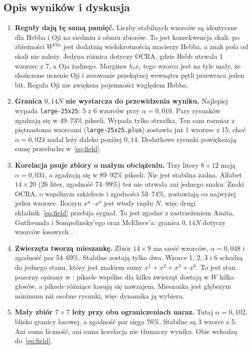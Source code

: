 \documentclass[11pt,a4paper]{article}
\begin{document}
\subsection{Opis wyników i dyskusja}
\begin{enumerate}
    \item \textbf{Reguły dają tę samą pamięć.}
    Liczby stabilnych wzorców są identyczne dla Hebba i Oji na siedmiu z ośmiu zbiorów. To jest konsekwencja skali: po zbieżności \(W^{\mathrm{Oja}}\) jest dodatnią wielokrotnością macierzy Hebba, a znak pola od skali nie zależy. Jedyna różnica dotyczy OCRA, gdzie Hebb utrwala 1 wzorzec z 7, a Oja żadnego. Margines \(h_i x_i\) tego wzorca jest na tyle mały, że skończone uczenie Oji i zerowanie przekątnej wewnątrz pętli przewraca jeden bit. Reguła Oji nie zwiększa pojemności względem Hebba.

    \item \textbf{Granica \(0{,}14N\) nie wystarcza do przewidzenia wyniku.}
    Najlepiej wypada \texttt{large-25x25}: 5 z 6 wzorców przy \(\alpha = 0{,}010\). Pary rysunków zgadzają się w 49--73\% pikseli. Wypada tylko strzałka. Ten sam rozmiar z piętnastoma wzorcami (\texttt{large-25x25.plus}) zostawia już 1 wzorzec z 15, choć \(\alpha = 0{,}024\) nadal leży daleko poniżej \(0{,}14\). Dodatkowe rysunki powiększają sumę przesłuchu w~\eqref{eq:field}.

    \item \textbf{Korelacja psuje zbiory o małym obciążeniu.}
    Trzy litery \(8\times 12\) mają \(\alpha = 0{,}031\), a zgadzają się w 89--92\% pikseli. Nie jest stabilna żadna. Alfabet \(14\times 20\) (26 liter, zgodność 74--99\%) też nie utrwala ani jednego znaku. Znaki OCRA, o wspólnym szkielecie i zgodności 53--74\%, zostawiają co najwyżej jeden wzorzec. Iloczyn \(x^{\mu}\cdot x^{\nu}\) jest wtedy rzędu \(N\), więc drugi składnik~\eqref{eq:field} przebija sygnał. To jest zgodne z zastrzeżeniem Amita, Gutfreunda i Sompolinsky'ego oraz McEliece'a: granica \(0{,}14N\) dotyczy wzorców losowych \cite{amit1985,mceliece1987}.

    \item \textbf{Zwierzęta tworzą mieszankę.}
    Zbiór \(14\times 9\) ma sześć wzorców, \(\alpha = 0{,}048\) i zgodność par 54--69\%. Stabilne zostają tylko dwa. Wzorce 1, 2, 3 i 6 schodzą do jednego stanu, który jest znakiem sumy \(x^{1}+x^{2}+x^{3}+x^{6}\). To jest stan pozorny opisany w \cite{amit1985}: piksele wspólne dla kilku zwierząt dostają w \(W\) kilka głosów, a piksele różniące kasują się nawzajem. Mieszanka jest głębszym minimum niż osobne rysunki, więc dynamika ją wybiera.

    \item \textbf{Mały zbiór \(7\times 7\) leży przy obu ograniczeniach naraz.}
    Tutaj \(\alpha = 0{,}102\), blisko granicy losowej, a zgodność par sięga 76\%. Stabilne są 3 wzorce z 5. Ani sama liczność, ani sama korelacja nie tłumaczy wyniku. Obie wchodzą do~\eqref{eq:field}.
\end{enumerate}
\end{document}
